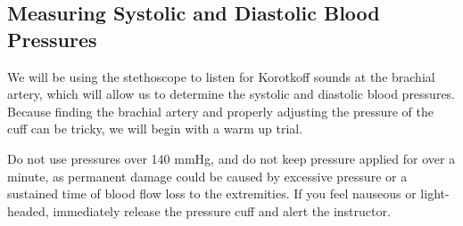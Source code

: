 \documentclass{article}
\begin{document}
\subsection*{Measuring Systolic and Diastolic Blood Pressures}
We will be using the stethoscope to listen for Korotkoff sounds at the brachial artery, which will allow us to determine the systolic and diastolic blood pressures. Because finding the brachial artery and properly adjusting the pressure of the cuff can be tricky, we will begin with a warm up trial.

\begin{warn}
	Do not use pressures over 140 mmHg, and do not keep pressure applied for over a minute, as permanent damage could be caused by excessive pressure or a sustained time of blood flow loss to the extremities. If you feel nauseous or light-headed, immediately release the pressure cuff and alert the instructor.
\end{warn}
\end{document}
